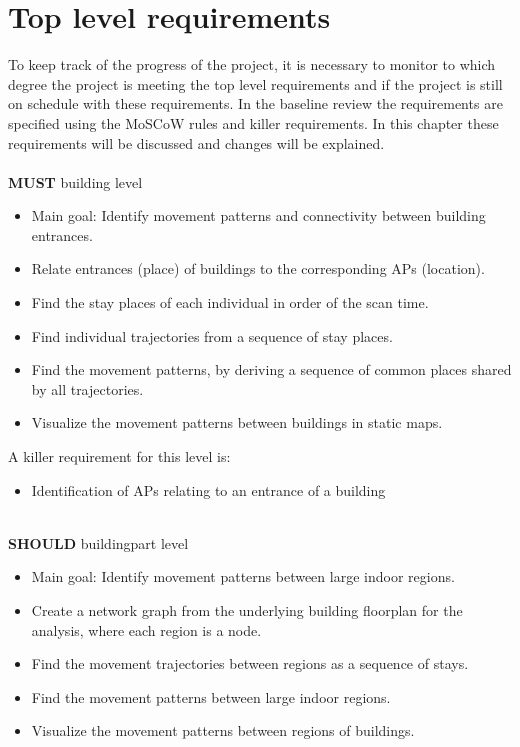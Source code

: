 \section{Top level requirements}
To keep track of the progress of the project, it is necessary to monitor to which degree the project is meeting the top level requirements and if the project is still on schedule with these requirements. In the baseline review the requirements are specified using the MoSCoW rules and killer requirements. In this chapter these requirements will be discussed and changes will be explained.\\\\
\textbf{MUST} building level
\begin{itemize}
\item Main goal: Identify movement patterns and connectivity between building entrances.
\item {\color{black!50}Relate entrances (place) of buildings to the corresponding APs (location).}
\item Find the stay places of each individual in order of the scan time.
\item Find individual trajectories from a sequence of stay places.
\item Find the movement patterns, by deriving a sequence of common places shared by all trajectories.
\item Visualize the movement patterns between buildings in static maps.
\end{itemize}
A killer requirement for this level is:
\begin{itemize}
\item {\color{black!50}Identification of APs relating to an entrance of a building}\\\\
\end{itemize}
\textbf{SHOULD} buildingpart level 
\begin{itemize}
\item Main goal: Identify movement patterns between large indoor regions. 
\item Create a network graph from the underlying building floorplan for the analysis, where each region is a node.
\item {\color{black!50}Find the movement trajectories between regions as a sequence of stays.}
\item Find the movement patterns between large indoor regions.
\item Visualize the movement patterns between regions of buildings.
\end{itemize}
